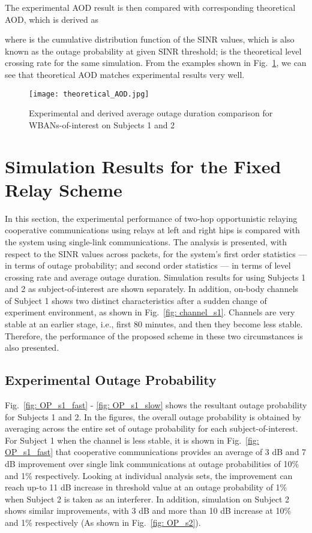 \documentclass[12pt,draftcls,a4paper,onecolumn,journal]{IEEEtran}
\begin{document}
The experimental AOD result is then compared with corresponding theoretical AOD, which is derived as


where  is the cumulative distribution function of the SINR values, which is also known as the outage probability at given SINR threshold;  is the theoretical level crossing rate for the same simulation. From the examples shown in Fig.~\ref{fig:Theoretical AOD}, we can see that theoretical AOD matches experimental results very well.

\begin{figure}[]
\centering
\texttt{[image: theoretical\_AOD.jpg]}
\caption{Experimental and derived average outage duration comparison for WBANs-of-interest on Subjects 1 and 2}
\label{fig:Theoretical AOD}
\end{figure}



\section{Simulation Results for the Fixed Relay Scheme}
In this section, the experimental performance of two-hop opportunistic relaying cooperative communications using relays at left and right hips is compared with the system using single-link communications. The analysis is presented, with respect to the SINR values across packets, for the system's first order statistics --- in terms of outage probability; and second order statistics --- in terms of level crossing rate and average outage duration. Simulation results for using Subjects 1 and 2 as subject-of-interest are shown separately. In addition, on-body channels of Subject 1 shows two distinct characteristics after a sudden change of experiment environment, as shown in Fig.~\ref{fig: channel_s1}. Channels are very stable at an earlier stage, i.e., first 80 minutes, and then they become less stable. Therefore, the performance of the proposed scheme in these two circumstances is also presented.


\subsection{Experimental Outage Probability}

Fig.~\ref{fig: OP_s1_fast} - \ref{fig: OP_s1_slow} shows the resultant outage probability for Subjects 1 and 2. In the figures, the overall outage probability is obtained by averaging across the entire set of outage probability for each subject-of-interest. For Subject 1 when the channel is less stable, it is shown in Fig.~\ref{fig: OP_s1_fast} that cooperative communications provides an average of 3 dB and 7 dB improvement over single link communications at outage probabilities of 10\% and 1\% respectively. Looking at individual analysis sets, the improvement can reach up-to 11 dB increase in threshold value at an outage probability of 1\% when Subject 2 is taken as an interferer. In addition, simulation on Subject 2 shows similar improvements, with 3 dB and more than 10 dB increase at 10\% and 1\% respectively (As shown in Fig.~\ref{fig: OP_s2}).
\end{document}
